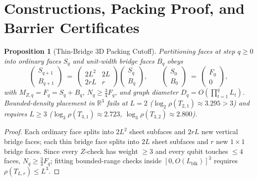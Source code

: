 \documentclass[aps,prx,reprint,superscriptaddress,nofootinbib,floatfix]{revtex4-2}
\newtheorem{proposition}{Proposition}
\begin{document}
\appendix

\section{Constructions, Packing Proof, and Barrier Certificates}
\label{app:construction}

\begin{proposition}[Thin-Bridge 3D Packing Cutoff]
\label{prop:growth}
Partitioning faces at step $q \ge 0$ into ordinary faces $S_q$ and unit-width bridge faces $B_q$ obeys
\begin{equation}
  \begin{pmatrix} S_{q+1} \\ B_{q+1} \end{pmatrix}
  \;=\;
  \begin{pmatrix} 2L^2 & 2L \\ 2rL & r \end{pmatrix}
  \begin{pmatrix} S_q \\ B_q \end{pmatrix},
  \qquad
  \begin{pmatrix} S_0 \\ B_0 \end{pmatrix}
  \;=\;
  \begin{pmatrix} F_0 \\ 0 \end{pmatrix},
  \label{eq:thin_recurrence}
\end{equation}
with $M_{Z,q} = F_q = S_q + B_q$, $N_q \ge \frac{3}{4}F_q$, and graph diameter $D_q = O(\prod_{t=1}^q L_t)$. Bounded-density placement in $\mathbb{R}^3$ fails at $L = 2$ ($\log_2 \rho(T_{2,1}) \approx 3.295 > 3$) and requires $L \ge 3$ ($\log_3 \rho(T_{3,1}) \approx 2.723$, $\log_3 \rho(T_{3,2}) \approx 2.800$).
\end{proposition}

\begin{proof}
Each ordinary face splits into $2L^2$ sheet subfaces and $2rL$ new vertical bridge faces; each thin bridge face splits into $2L$ sheet subfaces and $r$ new $1 \times 1$ bridge faces. Since every $Z$-check has weight $\ge 3$ and every qubit touches $\le 4$ faces, $N_q \ge \frac{3}{4}F_q$; fitting bounded-range checks inside $[0, O(L_{\mathrm{blk}})]^3$ requires $\rho(T_{L,r}) \le L^3$.
\end{proof}
\end{document}
